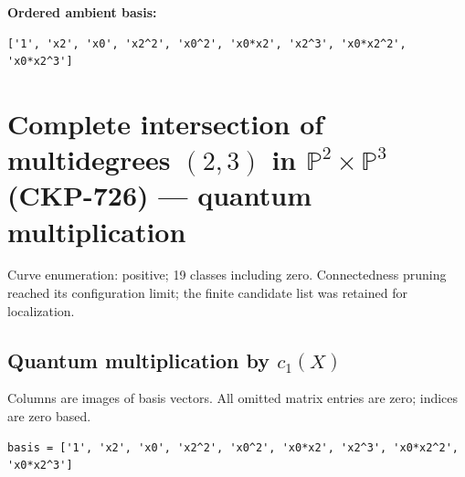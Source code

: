 \documentclass[10pt,a4paper]{article}
\begin{document}
\textbf{Ordered ambient basis:}
\begin{lstlisting}
['1', 'x2', 'x0', 'x2^2', 'x0^2', 'x0*x2', 'x2^3', 'x0*x2^2', 'x0*x2^3']
\end{lstlisting}

\clearpage\section*{Complete intersection of multidegrees $(2,3)$ in $\mathbb P^{2}\times \mathbb P^{3}$ (CKP-726) --- quantum multiplication}

Curve enumeration: positive; 19 classes including zero.
Connectedness pruning reached its configuration limit; the finite candidate list was retained for localization.
\subsection*{Quantum multiplication by $c_1(X)$}
Columns are images of basis vectors. All omitted matrix entries are zero; indices are zero based.

\begin{lstlisting}
basis = ['1', 'x2', 'x0', 'x2^2', 'x0^2', 'x0*x2', 'x2^3', 'x0*x2^2', 'x0*x2^3']
\end{lstlisting}
\end{document}

